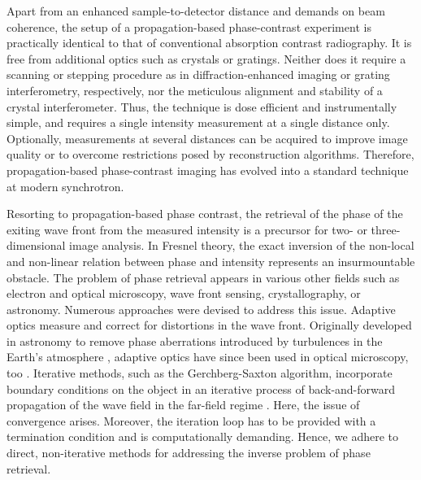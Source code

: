 \documentclass[
twoside,
openright,
titlepage,
numbers=noenddot,
headinclude,
fleqn,
a4paper,
footinclude=true,
cleardoublepage=empty,
abstractoff,
BCOR=5mm,
paper=a4,
fontsize=11pt,
british,ngerman,american,
]{scrreprt}
\begin{document}
Apart from an enhanced sample-to-detector distance and demands on beam
coherence, the setup of a propagation-based phase-contrast experiment
is practically identical to that of conventional absorption contrast
radiography.  It is free from additional optics such as crystals or
gratings.  Neither does it require a scanning or stepping procedure as
in diffraction-enhanced imaging or grating interferometry,
respectively, nor the meticulous alignment and stability of a crystal
interferometer.  Thus, the technique is dose efficient and
instrumentally simple, and requires a single intensity measurement at
a single distance only.  Optionally, measurements at several distances
can be acquired to improve image quality or to overcome restrictions
posed by reconstruction algorithms.  Therefore, propagation-based
phase-contrast imaging has evolved into a standard technique at modern
synchrotron.


Resorting to propagation-based phase contrast, the retrieval of the
phase of the exiting wave front from the measured intensity is a
precursor for two- or three-dimensional image analysis.  In Fresnel
theory, the exact inversion of the non-local and non-linear relation
between phase and intensity represents an insurmountable obstacle.
The problem of phase retrieval appears in various other fields such as
electron and optical microscopy, wave front sensing, crystallography,
or astronomy.  Numerous approaches were devised to address this issue.
Adaptive optics \eg{} measure and correct for distortions in the wave
front.  Originally developed in astronomy to remove phase aberrations
introduced by turbulences in the Earth's atmosphere
\cite{Beckers1993}, adaptive optics have since been used in optical
microscopy, too \cite{Booth2007}.  Iterative methods, such as the
Gerchberg-Saxton algorithm, incorporate boundary conditions on the
object in an iterative process of back-and-forward propagation of the
wave field in the far-field regime \cite{Gerchberg1972, Saxton1978}.
Here, the issue of convergence arises.  Moreover, the iteration loop
has to be provided with a termination condition and is computationally
demanding.  Hence, we adhere to direct, non-iterative methods for
addressing the inverse problem of phase retrieval.
\end{document}

